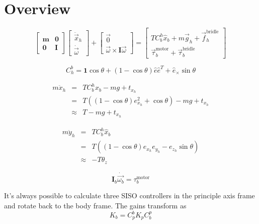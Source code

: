 \documentclass[11pt]{amsart}
\begin{document}
\section{Overview}

\begin{equation}
\left[
\begin{array}{cc}
\mathbf{m} & \mathbf{0} \\
\mathbf{0} & \mathbf{I}
\end{array}
\right]
\left[
\begin{array}{c}
\ddot{\vec{x}}_h \\
\dot{\vec{\omega}}
\end{array}
\right]
+
\left[
\begin{array}{c}
\vec{0} \\
\vec{\omega} \times \mathbf{I} \vec{\omega}
\end{array}
\right]
=
\left[
\begin{array}{c}
T C_b^h \hat{x}_b + m \vec{g}_h + \vec{f}^{\mathrm{bridle}}_h \\
\vec{\tau}^{\mathrm{motor}}_b + \vec{\tau}^{\mathrm{bridle}}_b
\end{array}
\right]
\end{equation}

\begin{equation}
C_h^b = \mathbf{1} \cos \theta +
(1 - \cos \theta) \hat{e} \hat{e}^T + \hat{e}_{\times} \sin \theta
\end{equation}

\begin{eqnarray}
m \ddot{x}_h &=& T C_b^h \hat{x}_b - m g + t_{x_h} \\
&=& T ((1 - \cos \theta) e^2_{x_h} + \cos \theta) - m g + t_{x_h} \\
&\approx& T - m g + t_{x_h}
\end{eqnarray}

\begin{eqnarray}
m \ddot{y}_h &=& T C_b^h \hat{x}_b \\
&=& T ((1 - \cos \theta) e_{x_h} e_{y_h} - e_{z_h} \sin \theta) \\
&\approx& -T \theta_z
\end{eqnarray}

\begin{equation}
\mathbf{I}_b \dot{\vec{\omega_b}} = \tau^{\mathrm{motor}}_b
\end{equation}

It's always possible to calculate three SISO controllers in the
principle axis frame and rotate back to the body frame.  The gains
transform as
\begin{equation}
K_b = C_p^b K_p C_b^p
\end{equation}
\end{document}
